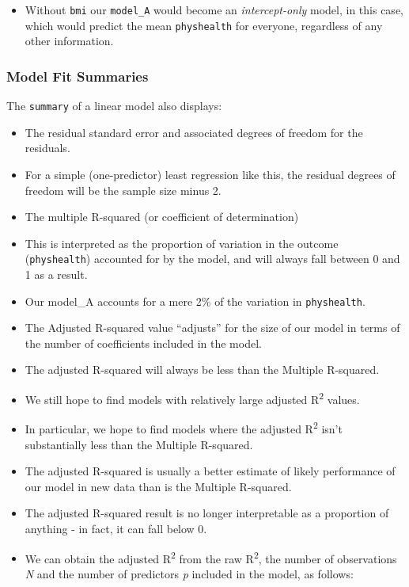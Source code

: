 \documentclass[]{book}
\providecommand{\tightlist}{%
  \setlength{\itemsep}{0pt}\setlength{\parskip}{0pt}}
\theoremstyle{definition}
\theoremstyle{definition}
\theoremstyle{definition}
\theoremstyle{remark}
\begin{document}
\begin{itemize}
\tightlist
\item
  Without \texttt{bmi} our \texttt{model\_A} would become an
  \emph{intercept-only} model, in this case, which would predict the
  mean \texttt{physhealth} for everyone, regardless of any other
  information.
\end{itemize}

\subsubsection{Model Fit Summaries}\label{model-fit-summaries}

The \texttt{summary} of a linear model also displays:

\begin{itemize}
\tightlist
\item
  The residual standard error and associated degrees of freedom for the
  residuals.
\item
  For a simple (one-predictor) least regression like this, the residual
  degrees of freedom will be the sample size minus 2.
\item
  The multiple R-squared (or coefficient of determination)
\item
  This is interpreted as the proportion of variation in the outcome
  (\texttt{physhealth}) accounted for by the model, and will always fall
  between 0 and 1 as a result.
\item
  Our model\_A accounts for a mere 2\% of the variation in
  \texttt{physhealth}.
\item
  The Adjusted R-squared value ``adjusts'' for the size of our model in
  terms of the number of coefficients included in the model.
\item
  The adjusted R-squared will always be less than the Multiple
  R-squared.
\item
  We still hope to find models with relatively large adjusted
  R\textsuperscript{2} values.
\item
  In particular, we hope to find models where the adjusted
  R\textsuperscript{2} isn't substantially less than the Multiple
  R-squared.
\item
  The adjusted R-squared is usually a better estimate of likely
  performance of our model in new data than is the Multiple R-squared.
\item
  The adjusted R-squared result is no longer interpretable as a
  proportion of anything - in fact, it can fall below 0.
\item
  We can obtain the adjusted R\textsuperscript{2} from the raw
  R\textsuperscript{2}, the number of observations \emph{N} and the
  number of predictors \emph{p} included in the model, as follows:
\end{itemize}
\end{document}
